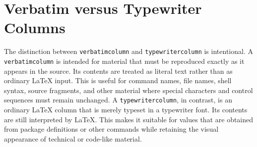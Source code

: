 \documentclass[
11pt,
a4paper,
oneside
]{scrbook}
\begin{document}
{%
\section{Verbatim versus Typewriter Columns}

The distinction between \texttt{verbatimcolumn} and
\texttt{typewritercolumn} is intentional.
A \texttt{verbatimcolumn} is intended for material that must be
reproduced exactly as it appears in the source. Its contents are treated
as literal text rather than as ordinary \LaTeX{} input. This is useful
for command names, file names, shell syntax, source fragments, and other
material where special characters and control sequences must remain
unchanged.
A \texttt{typewritercolumn}, in contrast, is an ordinary \LaTeX{}
column that is merely typeset in a typewriter font. Its contents are
still interpreted by \LaTeX{}. This makes it suitable for values that
are obtained from package definitions or other commands while retaining
the visual appearance of technical or code-like material.

}
\end{document}
